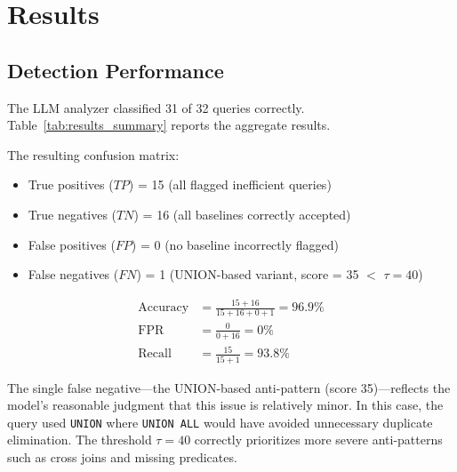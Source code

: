 \documentclass[conference]{IEEEtran}
\begin{document}
\section{Results}
\subsection{Detection Performance}
The LLM analyzer classified 31 of 32 queries correctly. Table~\ref{tab:results_summary} reports the aggregate results.

\begin{table}[t]
\caption{Aggregate Results Summary}
\label{tab:results_summary}
\centering
{}
\end{table}

The resulting confusion matrix:
\begin{itemize}
\item True positives ($TP$) = 15 (all flagged inefficient queries)
\item True negatives ($TN$) = 16 (all baselines correctly accepted)
\item False positives ($FP$) = 0 (no baseline incorrectly flagged)
\item False negatives ($FN$) = 1 (UNION-based variant, score = 35 $<$ $\tau = 40$)
\end{itemize}

\begin{align}
\text{Accuracy} &= \frac{15 + 16}{15 + 16 + 0 + 1} = 96.9\% \nonumber \\
\text{FPR} &= \frac{0}{0 + 16} = 0\% \nonumber \\
\text{Recall} &= \frac{15}{15 + 1} = 93.8\%
\label{eq:detection_results}
\end{align}

The single false negative---the UNION-based anti-pattern (score 35)---reflects the model's reasonable judgment that this issue is relatively minor. In this case, the query used \texttt{UNION} where \texttt{UNION ALL} would have avoided unnecessary duplicate elimination. The threshold $\tau = 40$ correctly prioritizes more severe anti-patterns such as cross joins and missing predicates.
\end{document}
